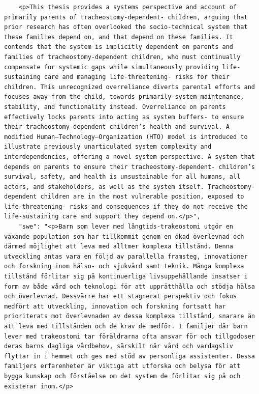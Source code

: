 \begin{casestudySection}
\begin{lstlisting}
    <p>This thesis provides a systems perspective and account of primarily parents of tracheostomy-dependent‑ children, arguing that prior research has often overlooked the socio‑technical system that these families depend on, and that depend on these families. It contends that the system is implicitly dependent on parents and families of tracheostomy-dependent children, who must continually compensate for systemic gaps while simultaneously providing life-sustaining care and managing life-threatening‑ risks for their children. This unrecognized overreliance diverts parental efforts and focuses away from the child, towards primarily system maintenance, stability, and functionality instead. Overreliance on parents effectively locks parents into acting as system buffers‑ to ensure their tracheostomy-dependent children’s health and survival. A modified Human–Technology–Organization (HTO) model is introduced to illustrate previously unarticulated system complexity and interdependencies, offering a novel system perspective. A system that depends on parents to ensure their tracheostomy-dependent‑ children’s survival, safety, and health is unsustainable for all humans, all actors, and stakeholders, as well as the system itself. Tracheostomy-dependent children are in the most vulnerable position, exposed to life-threatening‑ risks and consequences if they do not receive the life-sustaining care and support they depend on.</p>",
    "swe": "<p>Barn som lever med långtids-trakeostomi utgör en växande population som har tillkommit genom en ökad överlevnad och därmed möjlighet att leva med alltmer komplexa tillstånd. Denna utveckling antas vara en följd av parallella framsteg, innovationer och forskning inom hälso- och sjukvård samt teknik. Många komplexa tillstånd förlitar sig på kontinuerliga livsuppehållande insatser i form av både vård och teknologi för att upprätthålla och stödja hälsa och överlevnad. Dessvärre har ett stagnerat perspektiv och fokus medfört att utveckling, innovation och forskning fortsatt har prioriterats mot överlevnaden av dessa komplexa tillstånd, snarare än att leva med tillstånden och de krav de medför. I familjer där barn lever med trakeostomi tar föräldrarna ofta ansvar för och tillgodoser deras barns dagliga vårdbehov, särskilt när vård och vardagsliv flyttar in i hemmet och ges med stöd av personliga assistenter. Dessa familjers erfarenheter är viktiga att utforska och belysa för att bygga kunskap och förståelse om det system de förlitar sig på och existerar inom.</p>

\end{lstlisting}
\end{casestudySection}
